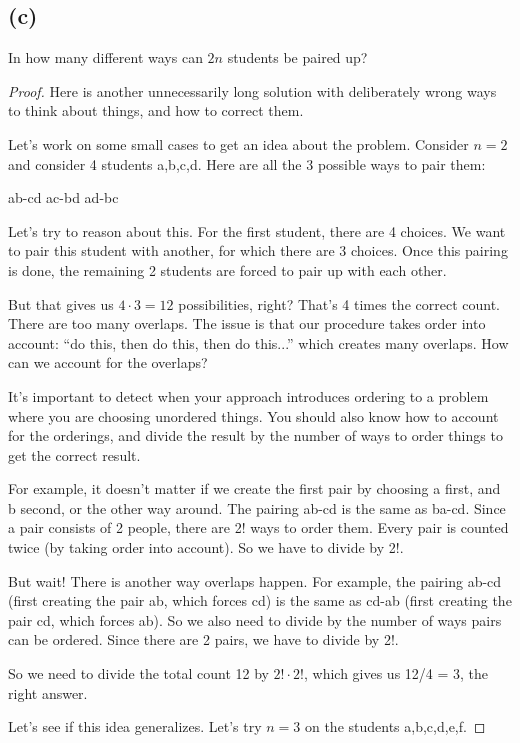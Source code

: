 \documentclass[14pt]{extarticle}
\begin{document}
\subsection{(c)}
In how many different ways can $2n$ students be paired up?
\begin{proof}
Here is another unnecessarily long solution with deliberately wrong ways to think about things, and how to correct them.

Let's work on some small cases to get an idea about the problem. Consider $n = 2$ and consider 4 students a,b,c,d. Here are all the 3 possible ways to pair them: 

ab-cd ac-bd ad-bc

Let's try to reason about this. For the first student, there are 4 choices. We want to pair this student with another, for which there are 3 choices. Once this pairing is done, the remaining 2 students are forced to pair up with each other.

But that gives us $4 \cdot 3 = 12$ possibilities, right? That's 4 times the correct count. There are too many overlaps. The issue is that our procedure takes order into account: ``do this, then do this, then do this...'' which creates many overlaps. How can we account for the overlaps? 

It's important to detect when your approach introduces ordering to a problem where you are choosing unordered things. You should also know how to account for the orderings, and divide the result by the number of ways to order things to get the correct result.

For example, it doesn't matter if we create the first pair by choosing a first, and b second, or the other way around. The pairing ab-cd is the same as ba-cd. Since a pair consists of 2 people, there are 2! ways to order them. Every pair is counted twice (by taking order into account). So we have to divide by 2!.

But wait! There is another way overlaps happen. For example, the pairing ab-cd (first creating the pair ab, which forces cd) is the same as cd-ab (first creating the pair cd, which forces ab). So we also need to divide by the number of ways pairs can be ordered. Since there are 2 pairs, we have to divide by 2!.

So we need to divide the total count 12 by $2! \cdot 2!$, which gives us 12/4 = 3, the right answer.

Let's see if this idea generalizes. Let's try $n = 3$ on the students a,b,c,d,e,f. 


\end{proof}
\end{document}
